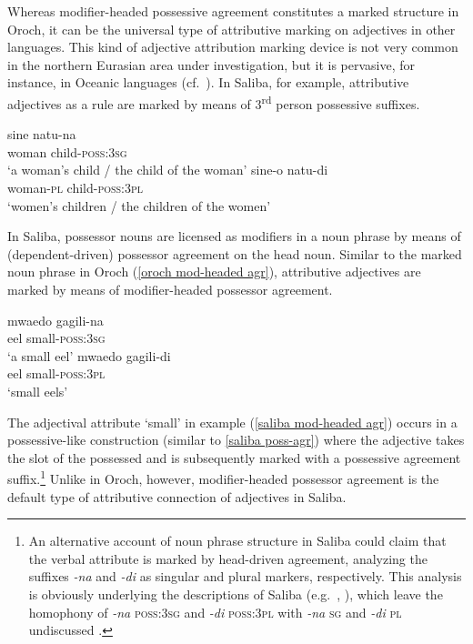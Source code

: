 Whereas modifier-headed possessive agreement constitutes a marked structure in Oroch, it can be the universal type of attributive marking on adjectives in other languages. This kind of adjective attribution marking device is not very common in the northern Eurasian area under investigation, but it is pervasive, for instance, in Oceanic languages (cf.~\citealt{ross1998}). In Saliba, for example, attributive adjectives as a rule are marked by means of 3\textsuperscript{rd} person possessive suffixes.
\begin{exe}
\ex
{} \label{saliba poss-agr}
\begin{xlist}
\ex
\gll 	sine natu-na\\
 	woman child-\textsc{poss:3sg}\\
\glt ‘a woman's child / the child of the woman’
\ex
\gll 	sine-o natu-di\\
	woman-\textsc{pl} child-\textsc{poss:3pl}\\
\glt	‘women's children / the children of the women’%
\end{xlist}
\end{exe}
In Saliba, possessor nouns are licensed as modifiers in a noun phrase by means of (dependent-driven) possessor agreement on the head noun. Similar to the marked noun phrase in Oroch (\ref{oroch mod-headed agr}), attributive adjectives are marked by means of modifier-headed possessor agreement.
\begin{exe}
\ex
{} \label{saliba mod-headed agr}
\begin{xlist}
\ex
\gll 	mwaedo gagili-na\\
 eel small-\textsc{poss:3sg}\\
\glt ‘a small eel’
\ex
\gll 	mwaedo gagili-di\\
	eel small-\textsc{poss:3pl}\\
\glt ‘small eels’
\end{xlist}
\end{exe}
The adjectival attribute ‘small’ in example (\ref{saliba mod-headed agr}) occurs in a possessive-like construction (similar to \ref{saliba poss-agr}) where the adjective takes the slot of the possessed and is subsequently marked with a possessive agreement suffix.\footnote{An alternative account of noun phrase structure in Saliba could claim that the verbal attribute is marked by head-driven agreement, analyzing the suffixes \textit{-na} and \textit{-di} as singular and plural markers, respectively. This analysis is obviously underlying the descriptions of Saliba (e.g.~\citealt{mosel1994}, \citealt{margetts1999}), which leave the homophony of \textit{-na} \textsc{poss:3sg} and \textit{-di} \textsc{poss:3pl} with \textit{-na} \textsc{sg} and \textit{-di} \textsc{pl} undiscussed .} %
Unlike in Oroch, however, modifier-headed possessor agreement is the default type of attributive connection of adjectives in Saliba.


